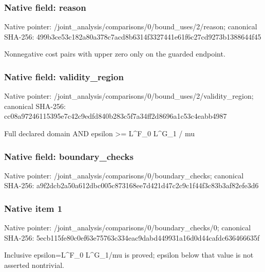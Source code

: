 \documentclass[10pt,a4paper]{article}
\begin{document}
\subsubsection{Native field: reason}
Native pointer: /joint\_\allowbreak{}analysis/comparisons/0/bound\_\allowbreak{}uses/2/reason; canonical SHA-256: 499b3ce53c182a80a378c7acd8b6314f3327441e61f6c27cd9273b1388644f45

\begingroup\raggedright\sloppy Nonnegative cost pairs with upper zero only on the guarded endpoint.\par\endgroup

\subsubsection{Native field: validity\_\allowbreak{}region}
Native pointer: /joint\_\allowbreak{}analysis/comparisons/0/bound\_\allowbreak{}uses/2/validity\_\allowbreak{}region; canonical SHA-256: cc08a97246115395e7c42c9edfd840b283c5f7a34ff2d8696a1c53c4eabb4987

\begingroup\raggedright\sloppy Full declared domain AND epsilon >=\allowbreak{} L\textasciicircum{}F\_\allowbreak{}0 L\textasciicircum{}G\_\allowbreak{}1 /\allowbreak{} mu\par\endgroup

\subsubsection{Native field: boundary\_\allowbreak{}checks}
Native pointer: /joint\_\allowbreak{}analysis/comparisons/0/boundary\_\allowbreak{}checks; canonical SHA-256: a9f2dcb2a50a612dbc005c873168ee7d421d47c2c9c1f44f3c83b3af82efe3d6

\subsubsection{Native item 1}
Native pointer: /joint\_\allowbreak{}analysis/comparisons/0/boundary\_\allowbreak{}checks/0; canonical SHA-256: 5ecb115fe80c0ef63e75763c334eac9dabd449931a16d0d44cafdc636466635f

\begingroup\raggedright\sloppy Inclusive epsilon=\allowbreak{}L\textasciicircum{}F\_\allowbreak{}0 L\textasciicircum{}G\_\allowbreak{}1/\allowbreak{}mu is proved;\allowbreak{} epsilon below that value is not asserted nontrivial.\par\endgroup
\end{document}

